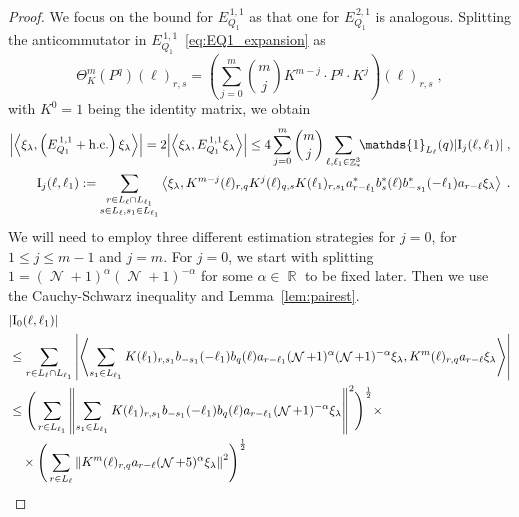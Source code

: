 \documentclass[12pt,a4paper]{article}
\numberwithin{equation}{section}
\newcommand{\1}{\mathbb{I}}
\newcommand{\I}{\mathrm{I}}
\DeclareMathOperator{\R}{\mathbb{R}}
\DeclareMathOperator{\Z}{\mathbb{Z}}
\DeclareMathOperator{\NN}{\mathcal{N}}
\newcommand{\half}{\frac{1}{2}}
\newcommand{\eva}[1]{\left\langle #1 \right\rangle}
\theoremstyle{plain}
\theoremstyle{definition}
\theoremstyle{remark}
\theoremstyle{plain}
\theoremstyle{definition}
\theoremstyle{remark}
\begin{document}
\begin{proof}
We focus on the bound for $ E^{\,1,1}_{Q_1} $ as that one for $ E^{\,2,1}_{Q_1} $ is analogous. Splitting the anticommutator in $ E^{\,1,1}_{Q_1} $~\eqref{eq:EQ1_expansion} as
\begin{equation} \label{eq:q-q}
	\Theta^m_K(P^q)(\ell)_{r,s}
	= \left(\sum\limits_{j=0}^m {{m}\choose j} K^{m-j} \cdot P^q \cdot K^{j}\right)(\ell)_{r,s} \;,
\end{equation}
with $ K^0 = 1 $ being the identity matrix, we obtain
\begin{equation} \label{eq:EQ1111}
\begin{aligned}
	\abs{\eva{\xi_\lambda,\left(E^{\,1,1}_{Q_1}+\mathrm{h.c.}\right) \xi_\lambda }} 
	= 2\abs{\eva{\xi_\lambda, E^{\,1,1}_{Q_1} \xi_\lambda }}
	\le 4 \sum_{j=0}^m {{m}\choose j} \sum\limits_{\ell,\ell_1  \in \Z^3_*}\!\! \mathds{1}_{L_\ell}(q) |\I_j(\ell, \ell_1)| \;,\\
	\I_j(\ell, \ell_1)
	:= \sum\limits_{\substack{r\in L_{\ell} \cap L_{\ell_1}\\ s \in L_{\ell},s_1\in L_{\ell_1}}}
		\eva{\xi_\lambda, K^{m-j}(\ell)_{r,q} K^{j}(\ell)_{q,s} K(\ell_1)_{r,s_1} a^*_{r-\ell_1} b^*_{s}(\ell) b^*_{-s_1}(-\ell_1) a_{r-\ell} \xi_\lambda} \;. \\
\end{aligned}
\end{equation}
We will need to employ three different estimation strategies for $ j = 0 $, for $ 1 \le j \le m-1 $ and $ j = m $. For $ j = 0 $, we start with splitting $1 = (\NN+1)^{\alpha}(\NN+1)^{-\alpha}$ for some $\alpha \in \R$ to be fixed later. Then we use the Cauchy-Schwarz inequality and Lemma~\ref{lem:pairest}.
\begin{align}
	&|\I_0(\ell, \ell_1)| \nonumber\\
    &\le \sum\limits_{r \in L_\ell \cap L_{\ell_1}} \abs{\eva{ \sum\limits_{s_1 \in L_{\ell_1}} K(\ell_1)_{r,s_1} b_{-s_1}(-\ell_1) b_{q}(\ell) a_{r-\ell_1} (\NN+1)^{\alpha} (\NN+1)^{-\alpha} \xi_\lambda,  K^{m}(\ell)_{r,q} a_{r-\ell} \xi_\lambda }}\nonumber\\
    &\leq \Bigg( \sum\limits_{r \in L_{\ell_1}} \norm{\sum\limits_{s_1 \in L_{\ell_1}} K(\ell_1)_{r,s_1} b_{-s_1}(-\ell_1) b_{q}(\ell) a_{r-\ell_1} (\NN+1)^{-\alpha}\xi_\lambda}^2\Bigg)^\half \times\nonumber\\
    &\quad \times \Bigg( \sum\limits_{r \in L_\ell}  \norm{  K^{m}(\ell)_{r,q}  a_{r-\ell} (\NN+5)^{\alpha}\xi_\lambda }^2\Bigg)^\half \nonumber\\

\end{align}
\end{proof}
\end{document}

